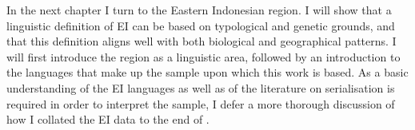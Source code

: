 In the next chapter I turn to the Eastern Indonesian region. I will show that a linguistic definition of EI can be based on typological and genetic grounds, and that this definition aligns well with both biological and geographical patterns. I will first introduce the region as a linguistic area, followed by an introduction to the languages that make up the sample upon which this work is based. As a basic understanding of the EI languages as well as of the literature on serialisation is required in order to interpret the sample, I defer a more thorough discussion of how I collated the EI data to the end of .
